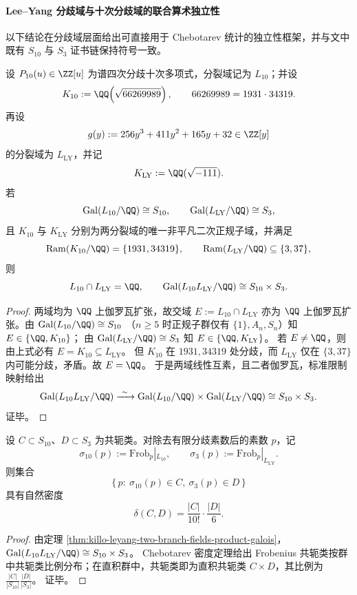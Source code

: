 \paragraph{Lee--Yang 分歧域与十次分歧域的联合算术独立性}
以下结论在分歧域层面给出可直接用于 Chebotarev 统计的独立性框架，并与文中既有 \(S_{10}\) 与 \(S_3\) 证书链保持符号一致。

\begin{theorem}\label{thm:killo-leyang-two-branch-fields-product-galois}
设 \(P_{10}(u)\in\ZZ[u]\) 为谱四次分歧十次多项式，分裂域记为 \(L_{10}\)；并设
\[
K_{10}:=\QQ\!\left(\sqrt{66269989}\right),\qquad 66269989=1931\cdot 34319.
\]
再设
\[
g(y):=256y^3+411y^2+165y+32\in\ZZ[y]
\]
的分裂域为 \(L_{\mathrm{LY}}\)，并记
\[
K_{\mathrm{LY}}:=\QQ(\sqrt{-111}).
\]
若
\[
\mathrm{Gal}(L_{10}/\QQ)\cong S_{10},\qquad
\mathrm{Gal}(L_{\mathrm{LY}}/\QQ)\cong S_{3},
\]
且 \(K_{10}\) 与 \(K_{\mathrm{LY}}\) 分别为两分裂域的唯一非平凡二次正规子域，并满足
\[
\mathrm{Ram}(K_{10}/\QQ)=\{1931,34319\},
\qquad
\mathrm{Ram}(L_{\mathrm{LY}}/\QQ)\subseteq\{3,37\},
\]
则
\[
L_{10}\cap L_{\mathrm{LY}}=\QQ,
\qquad
\mathrm{Gal}(L_{10}L_{\mathrm{LY}}/\QQ)\cong S_{10}\times S_{3}.
\]
\end{theorem}
\begin{proof}
两域均为 \(\QQ\) 上伽罗瓦扩张，故交域
\(
E:=L_{10}\cap L_{\mathrm{LY}}
\)
亦为 \(\QQ\) 上伽罗瓦扩张。由
\(
\mathrm{Gal}(L_{10}/\QQ)\cong S_{10}
\)
（\(n\ge 5\) 时正规子群仅有 \(\{1\},A_n,S_n\)）知
\(
E\in\{\QQ,K_{10}\}
\)；
由
\(
\mathrm{Gal}(L_{\mathrm{LY}}/\QQ)\cong S_3
\)
知
\(
E\in\{\QQ,K_{\mathrm{LY}}\}
\)。
若 \(E\neq \QQ\)，则由上式必有 \(E=K_{10}\subseteq L_{\mathrm{LY}}\)。
但 \(K_{10}\) 在 \(1931,34319\) 处分歧，而 \(L_{\mathrm{LY}}\) 仅在 \(\{3,37\}\) 内可能分歧，矛盾。故 \(E=\QQ\)。
于是两域线性互素，且二者伽罗瓦，标准限制映射给出
\[
\mathrm{Gal}(L_{10}L_{\mathrm{LY}}/\QQ)
\xrightarrow{\ \sim\ }
\mathrm{Gal}(L_{10}/\QQ)\times \mathrm{Gal}(L_{\mathrm{LY}}/\QQ)
\cong S_{10}\times S_3.
\]
证毕。
\end{proof}

\begin{theorem}\label{thm:killo-leyang-joint-chebotarev-product-law}
设 \(C\subset S_{10}\)、\(D\subset S_3\) 为共轭类。对除去有限分歧素数后的素数 \(p\)，记
\[
\sigma_{10}(p):=\mathrm{Frob}_p|_{L_{10}},\qquad
\sigma_{3}(p):=\mathrm{Frob}_p|_{L_{\mathrm{LY}}}.
\]
则集合
\[
\{\,p:\ \sigma_{10}(p)\in C,\ \sigma_3(p)\in D\,\}
\]
具有自然密度
\[
\delta(C,D)=\frac{|C|}{10!}\cdot \frac{|D|}{6}.
\]
\end{theorem}
\begin{proof}
由定理 \ref{thm:killo-leyang-two-branch-fields-product-galois}，
\(
\mathrm{Gal}(L_{10}L_{\mathrm{LY}}/\QQ)\cong S_{10}\times S_3
\)。
Chebotarev 密度定理给出 Frobenius 共轭类按群中共轭类比例分布；在直积群中，共轭类即为直积共轭类 \(C\times D\)，其比例为
\(
\frac{|C|}{|S_{10}|}\frac{|D|}{|S_3|}
\)。
证毕。
\end{proof}


